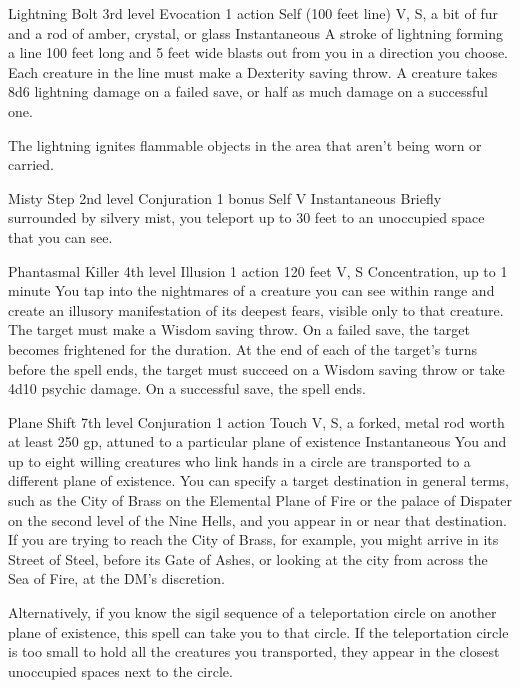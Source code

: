\documentclass[10pt,a4paper,twoside,bg=print,twocolumn,openany,nodeprecatedcode]{dndbook}
\begin{document}


\DndSpellHeader%
{Lightning Bolt}
{3rd level Evocation}
{1 action}
{Self (100 feet line)}
{V, S, a bit of fur and a rod of amber, crystal, or glass}
{Instantaneous}
A stroke of lightning forming a line 100 feet long and 5 feet wide blasts out from you in a direction you choose. Each creature in the line must make a Dexterity saving throw. A creature takes 8d6 lightning damage on a failed save, or half as much damage on a successful one.

The lightning ignites flammable objects in the area that aren't being worn or carried.



\DndSpellHeader%
{Misty Step}
{2nd level Conjuration}
{1 bonus}
{Self}
{V}
{Instantaneous}
Briefly surrounded by silvery mist, you teleport up to 30 feet to an unoccupied space that you can see.



\DndSpellHeader%
{Phantasmal Killer}
{4th level Illusion}
{1 action}
{120 feet}
{V, S}
{Concentration, up to 1 minute}
You tap into the nightmares of a creature you can see within range and create an illusory manifestation of its deepest fears, visible only to that creature. The target must make a Wisdom saving throw. On a failed save, the target becomes frightened for the duration. At the end of each of the target's turns before the spell ends, the target must succeed on a Wisdom saving throw or take 4d10 psychic damage. On a successful save, the spell ends.



\DndSpellHeader%
{Plane Shift}
{7th level Conjuration}
{1 action}
{Touch}
{V, S, a forked, metal rod worth at least 250 gp, attuned to a particular plane of existence}
{Instantaneous}
You and up to eight willing creatures who link hands in a circle are transported to a different plane of existence. You can specify a target destination in general terms, such as the City of Brass on the Elemental Plane of Fire or the palace of Dispater on the second level of the Nine Hells, and you appear in or near that destination. If you are trying to reach the City of Brass, for example, you might arrive in its Street of Steel, before its Gate of Ashes, or looking at the city from across the Sea of Fire, at the DM's discretion.

Alternatively, if you know the sigil sequence of a teleportation circle on another plane of existence, this spell can take you to that circle. If the teleportation circle is too small to hold all the creatures you transported, they appear in the closest unoccupied spaces next to the circle.
\end{document}

